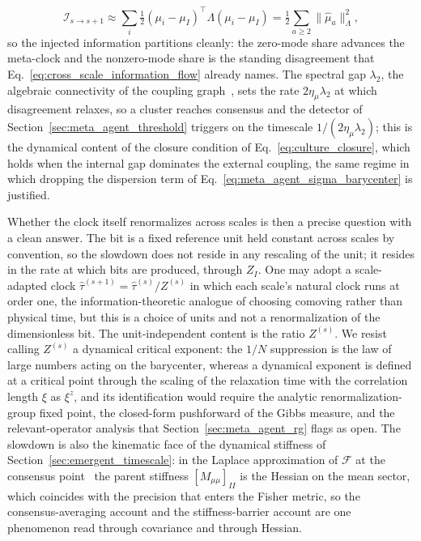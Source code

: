 \documentclass[11pt]{article}
\begin{document}
\begin{equation}
\mathcal{I}_{s\to s+1} \approx \sum_{i} \tfrac{1}{2}(\mu_i - \mu_I)^\top \Lambda (\mu_i - \mu_I) = \tfrac{1}{2}\sum_{a\ge 2}\|\hat\mu_a\|_\Lambda^2,
\label{eq:Ilow_eq_dispersion}
\end{equation}
so the injected information partitions cleanly: the zero-mode share advances the meta-clock and the nonzero-mode share is the standing disagreement that Eq.~\eqref{eq:cross_scale_information_flow} already names. The spectral gap $\lambda_2$, the algebraic connectivity of the coupling graph~\cite{Fiedler1973}, sets the rate $2\eta_\mu\lambda_2$ at which disagreement relaxes, so a cluster reaches consensus and the detector of Section~\ref{sec:meta_agent_threshold} triggers on the timescale $1/(2\eta_\mu\lambda_2)$; this is the dynamical content of the closure condition of Eq.~\eqref{eq:culture_closure}, which holds when the internal gap dominates the external coupling, the same regime in which dropping the dispersion term of Eq.~\eqref{eq:meta_agent_sigma_barycenter} is justified.

Whether the clock itself renormalizes across scales is then a precise question with a clean answer. The bit is a fixed reference unit held constant across scales by convention, so the slowdown does not reside in any rescaling of the unit; it resides in the rate at which bits are produced, through $Z_I$. One may adopt a scale-adapted clock $\hat{\tau}^{(s+1)} = \hat{\tau}^{(s)}/Z^{(s)}$ in which each scale's natural clock runs at order one, the information-theoretic analogue of choosing comoving rather than physical time, but this is a choice of units and not a renormalization of the dimensionless bit. The unit-independent content is the ratio $Z^{(s)}$. We resist calling $Z^{(s)}$ a dynamical critical exponent: the $1/N$ suppression is the law of large numbers acting on the barycenter, whereas a dynamical exponent is defined at a critical point through the scaling of the relaxation time with the correlation length $\xi$ as $\xi^z$, and its identification would require the analytic renormalization-group fixed point, the closed-form pushforward of the Gibbs measure, and the relevant-operator analysis that Section~\ref{sec:meta_agent_rg} flags as open. The slowdown is also the kinematic face of the dynamical stiffness of Section~\ref{sec:emergent_timescale}: in the Laplace approximation of $\mathcal{F}$ at the consensus point~\cite[\S2.2.2]{Beal2003} the parent stiffness $[M_{\mu\mu}]_{II}$ is the Hessian on the mean sector, which coincides with the precision that enters the Fisher metric, so the consensus-averaging account and the stiffness-barrier account are one phenomenon read through covariance and through Hessian.
\end{document}
